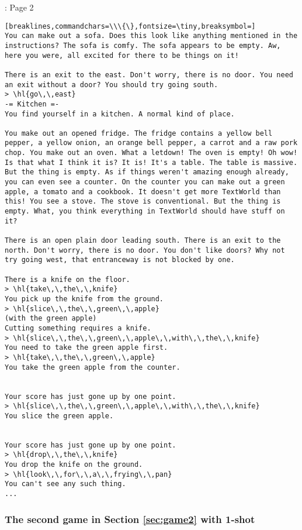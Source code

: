\begin{AIbox}[width=0.9\textwidth]{\DV: Page 2}
\begin{Verbatim}[breaklines,commandchars=\\\{\},fontsize=\tiny,breaksymbol=]
You can make out a sofa. Does this look like anything mentioned in the instructions? The sofa is comfy. The sofa appears to be empty. Aw, here you were, all excited for there to be things on it!

There is an exit to the east. Don't worry, there is no door. You need an exit without a door? You should try going south.
> \hl{go\,\,east}
-= Kitchen =-
You find yourself in a kitchen. A normal kind of place.

You make out an opened fridge. The fridge contains a yellow bell pepper, a yellow onion, an orange bell pepper, a carrot and a raw pork chop. You make out an oven. What a letdown! The oven is empty! Oh wow! Is that what I think it is? It is! It's a table. The table is massive. But the thing is empty. As if things weren't amazing enough already, you can even see a counter. On the counter you can make out a green apple, a tomato and a cookbook. It doesn't get more TextWorld than this! You see a stove. The stove is conventional. But the thing is empty. What, you think everything in TextWorld should have stuff on it?

There is an open plain door leading south. There is an exit to the north. Don't worry, there is no door. You don't like doors? Why not try going west, that entranceway is not blocked by one.

There is a knife on the floor.
> \hl{take\,\,the\,\,knife}
You pick up the knife from the ground.
> \hl{slice\,\,the\,\,green\,\,apple}
(with the green apple)
Cutting something requires a knife.
> \hl{slice\,\,the\,\,green\,\,apple\,\,with\,\,the\,\,knife}
You need to take the green apple first.
> \hl{take\,\,the\,\,green\,\,apple}
You take the green apple from the counter.


Your score has just gone up by one point.
> \hl{slice\,\,the\,\,green\,\,apple\,\,with\,\,the\,\,knife}
You slice the green apple.


Your score has just gone up by one point.
> \hl{drop\,\,the\,\,knife}
You drop the knife on the ground.
> \hl{look\,\,for\,\,a\,\,frying\,\,pan}
You can't see any such thing.
...
\end{Verbatim}
\end{AIbox}


\subsubsection{The second game in Section \ref{sec:game2} with 1-shot}\label{sec:game2_log_shot1}

